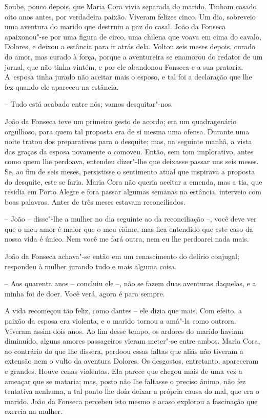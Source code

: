 Soube, pouco depois, que Maria Cora vivia separada do marido. Tinham
casado oito anos antes, por verdadeira paixão. Viveram felizes cinco. Um
dia, sobreveio uma aventura do marido que destruiu a paz do casal. João
da Fonseca apaixonou"-se por uma figura de circo, uma chilena que voava
em cima do cavalo, Dolores, e deixou a estância para ir atrás dela.
Voltou seis meses depois, curado do amor, mas curado à força, porque a
aventureira se enamorou do redator de um jornal, que não tinha vintém, e
por ele abandonou Fonseca e a sua prataria. A~esposa tinha jurado não
aceitar mais o esposo, e tal foi a declaração que lhe fez quando ele
apareceu na estância.

-- Tudo está acabado entre nós; vamos desquitar"-nos.

João da Fonseca teve um primeiro gesto de acordo; era um quadragenário
orgulhoso, para quem tal proposta era de si mesma uma ofensa. Durante
uma noite tratou dos preparativos para o desquite; mas, na seguinte
manhã, a vista das graças da esposa novamente o comoveu. Então, sem tom
implorativo, antes como quem lhe perdoava, entendeu dizer"-lhe que
deixasse passar uns seis meses. Se, ao fim de seis meses, persistisse o
sentimento atual que inspirava a proposta do desquite, este se faria.
Maria Cora não queria aceitar a emenda, mas a tia, que residia em Porto
Alegre e fora passar algumas semanas na estância, interveio com boas
palavras. Antes de três meses estavam reconciliados.

-- João -- disse"-lhe a mulher no dia seguinte ao da reconciliação --,
você deve ver que o meu amor é maior que o meu ciúme, mas fica entendido
que este caso da nossa vida é único. Nem você me fará outra, nem eu lhe
perdoarei nada mais.

João da Fonseca achava"-se então em um renascimento do delírio conjugal;
respondeu à mulher jurando tudo e mais alguma coisa.

-- Aos quarenta anos -- concluiu ele --, não se fazem duas aventuras
daquelas, e a minha foi de doer. Você verá, agora é para sempre.

A vida recomeçou tão feliz, como dantes -- ele dizia que mais. Com
efeito, a paixão da esposa era violenta, e o marido tornou a amá"-la como
outrora. Viveram assim dois anos. Ao fim desse tempo, os ardores do
marido haviam diminuído, alguns amores passageiros vieram meter"-se entre
ambos. Maria Cora, ao contrário do que lhe dissera, perdoou essas faltas
que aliás não tiveram a extensão nem o vulto da aventura Dolores. Os
desgostos, entretanto, apareceram e grandes. Houve cenas violentas. Ela
parece que chegou mais de uma vez a ameaçar que se mataria; mas, posto
não lhe faltasse o preciso ânimo, não fez tentativa nenhuma, a tal ponto
lhe doía deixar a própria causa do mal, que era o marido. João da
Fonseca percebeu isto mesmo e acaso explorou a fascinação que exercia na
mulher.

